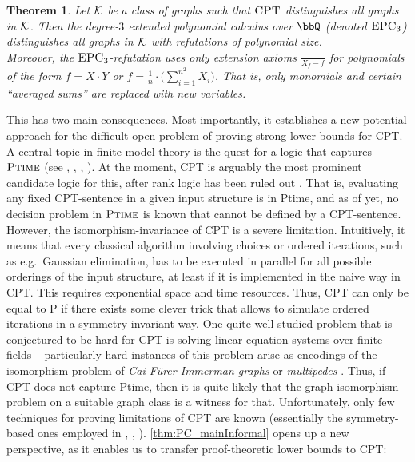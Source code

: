 \documentclass[10pt,a4paper]{article}
\newtheorem{theorem}{Theorem}
\newcommand{\CPT}{\mbox{\sc CPT}}
\newcommand{\EPC}{\mbox{\sc EPC}}
\newcommand{\ptime}{\mbox{\sc Ptime}}
\newcommand{\Kk}{{\cal K}}
\begin{document}
	\begin{theorem}
		\label{thm:PC_mainInformal}
		Let $\Kk$ be a class of graphs such that $\CPT$ distinguishes all graphs in $\Kk$. Then the degree-$3$ extended polynomial calculus over $\bbQ$ (denoted $\EPC_3$) distinguishes all graphs in $\Kk$ with refutations of polynomial size.\\
		Moreover, the $\EPC_3$-refutation uses only extension axioms $\frac{}{X_f - f}$ for polynomials of the form $f = X \cdot Y$ or $f = \frac{1}{n} \cdot \Big(\sum_{i=1}^{n^2} X_i \Big)$. That is, only monomials and certain ``averaged sums'' are replaced with new variables.
	\end{theorem}

	This has two main consequences. Most importantly, it establishes a new potential approach for the difficult open problem of proving strong lower bounds for CPT. A central topic in finite model theory is the quest for a logic that captures $\ptime$ (see \cite{chandra1980structure}, \cite{grohe2008quest}, \cite{gurevich1985logic}, \cite{pakusa2015linear}). At the moment, CPT is arguably the most prominent candidate logic for this, after rank logic has been ruled out \cite{lichter}.
	That is, evaluating any fixed CPT-sentence in a given input structure is in \ptime, and as of yet, no decision problem in $\ptime$ is known that cannot be defined by a CPT-sentence. However, the isomorphism-invariance of CPT is a severe limitation. Intuitively, it means that every classical algorithm involving choices or ordered iterations, such as e.g.\ Gaussian elimination, has to be executed in parallel for all possible orderings of the input structure, at least if it is implemented in the naive way in CPT. This requires exponential space and time resources. Thus, CPT can only be equal to P if there exists some clever trick that allows to simulate ordered iterations in a symmetry-invariant way. 
	One quite well-studied problem that is conjectured to be hard for CPT is solving linear equation systems over finite fields -- particularly hard instances of this problem arise as encodings of the isomorphism problem of \emph{Cai-Fürer-Immerman graphs} \cite{caifurimm92} or \emph{multipedes} \cite{multipedes}. Thus, if CPT does not capture \ptime, then it is quite likely that the graph isomorphism problem on a suitable graph class is a witness for that. Unfortunately, only few techniques for proving limitations of CPT are known (essentially the symmetry-based ones employed in \cite{dawar2008}, \cite{rossman2010choiceless}, \cite{pago}).
 	\autoref{thm:PC_mainInformal} opens up a new perspective, as it enables us to transfer proof-theoretic lower bounds to CPT:
\end{document}
